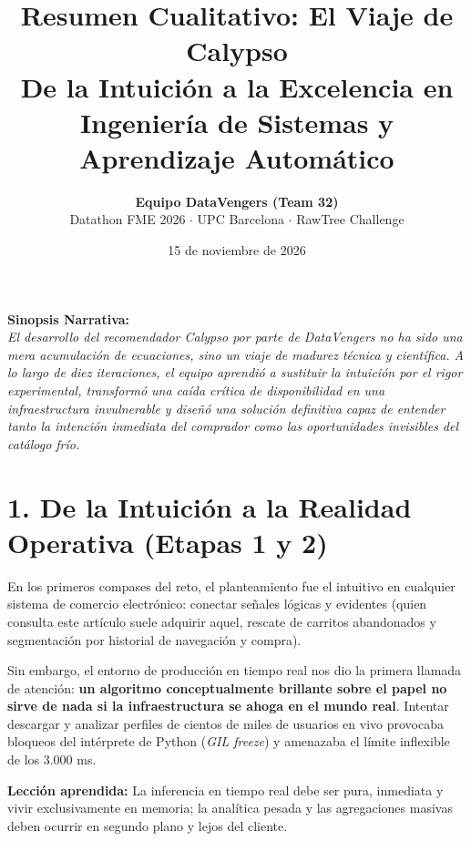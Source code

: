 \documentclass[11pt,a4paper]{article}
\title{\vspace{-1.2cm}\textbf{\huge\color{primary} Resumen Cualitativo: El Viaje de Calypso}\\[0.3cm]
\Large De la Intuición a la Excelencia en Ingeniería de Sistemas y Aprendizaje Automático}
\author{\textbf{Equipo DataVengers (Team 32)} \\ Datathon FME 2026 $\cdot$ UPC Barcelona $\cdot$ RawTree Challenge}
\date{15 de noviembre de 2026}
\begin{document}
\maketitle
\thispagestyle{fancy}

\begin{tcolorbox}[colback=lightgray, colframe=primary, arc=2mm, boxrule=0.8pt, left=12pt, right=12pt, top=8pt, bottom=8pt]
\noindent\textbf{\large Sinopsis Narrativa:}\\[0.15cm]
\textit{El desarrollo del recomendador Calypso por parte de DataVengers no ha sido una mera acumulación de ecuaciones, sino un viaje de madurez técnica y científica. A lo largo de diez iteraciones, el equipo aprendió a sustituir la intuición por el rigor experimental, transformó una caída crítica de disponibilidad en una infraestructura invulnerable y diseñó una solución definitiva capaz de entender tanto la intención inmediata del comprador como las oportunidades invisibles del catálogo frío.}
\end{tcolorbox}

\vspace{0.4cm}

\section{1. De la Intuición a la Realidad Operativa (Etapas 1 y 2)}

En los primeros compases del reto, el planteamiento fue el intuitivo en cualquier sistema de comercio electrónico: conectar señales lógicas y evidentes (quien consulta este artículo suele adquirir aquel, rescate de carritos abandonados y segmentación por historial de navegación y compra). 

Sin embargo, el entorno de producción en tiempo real nos dio la primera llamada de atención: \textbf{un algoritmo conceptualmente brillante sobre el papel no sirve de nada si la infraestructura se ahoga en el mundo real}. Intentar descargar y analizar perfiles de cientos de miles de usuarios en vivo provocaba bloqueos del intérprete de Python (\textit{GIL freeze}) y amenazaba el límite inflexible de los 3.000 ms. 

\begin{tcolorbox}[colback=white, colframe=bordergray, arc=1mm, boxrule=0.5pt, left=8pt, right=8pt, top=4pt, bottom=4pt]
\textbf{Lección aprendida:} La inferencia en tiempo real debe ser pura, inmediata y vivir exclusivamente en memoria; la analítica pesada y las agregaciones masivas deben ocurrir en segundo plano y lejos del cliente.
\end{tcolorbox}
\end{document}
